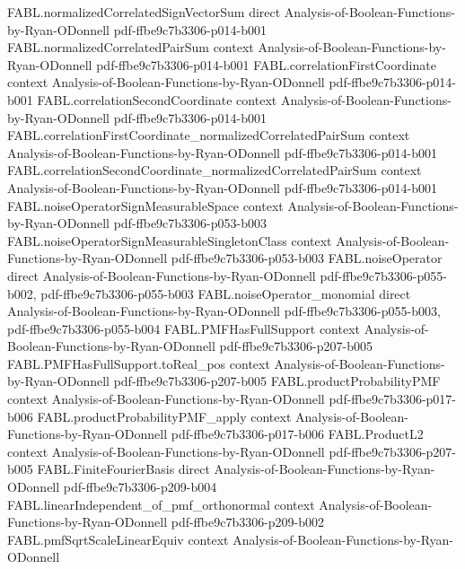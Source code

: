 \begin{theorem}
\proofstep
  {FABL.normalizedCorrelatedSignVectorSum}
  {direct}
  {Analysis-of-Boolean-Functions-by-Ryan-ODonnell}
  {pdf-ffbe9c7b3306-p014-b001}
\proofstep
  {FABL.normalizedCorrelatedPairSum}
  {context}
  {Analysis-of-Boolean-Functions-by-Ryan-ODonnell}
  {pdf-ffbe9c7b3306-p014-b001}
\proofstep
  {FABL.correlationFirstCoordinate}
  {context}
  {Analysis-of-Boolean-Functions-by-Ryan-ODonnell}
  {pdf-ffbe9c7b3306-p014-b001}
\proofstep
  {FABL.correlationSecondCoordinate}
  {context}
  {Analysis-of-Boolean-Functions-by-Ryan-ODonnell}
  {pdf-ffbe9c7b3306-p014-b001}
\proofstep
  {FABL.correlationFirstCoordinate_normalizedCorrelatedPairSum}
  {context}
  {Analysis-of-Boolean-Functions-by-Ryan-ODonnell}
  {pdf-ffbe9c7b3306-p014-b001}
\proofstep
  {FABL.correlationSecondCoordinate_normalizedCorrelatedPairSum}
  {context}
  {Analysis-of-Boolean-Functions-by-Ryan-ODonnell}
  {pdf-ffbe9c7b3306-p014-b001}
\proofstep
  {FABL.noiseOperatorSignMeasurableSpace}
  {context}
  {Analysis-of-Boolean-Functions-by-Ryan-ODonnell}
  {pdf-ffbe9c7b3306-p053-b003}
\proofstep
  {FABL.noiseOperatorSignMeasurableSingletonClass}
  {context}
  {Analysis-of-Boolean-Functions-by-Ryan-ODonnell}
  {pdf-ffbe9c7b3306-p053-b003}
\proofstep
  {FABL.noiseOperator}
  {direct}
  {Analysis-of-Boolean-Functions-by-Ryan-ODonnell}
  {pdf-ffbe9c7b3306-p055-b002,
    pdf-ffbe9c7b3306-p055-b003}
\proofstep
  {FABL.noiseOperator_monomial}
  {direct}
  {Analysis-of-Boolean-Functions-by-Ryan-ODonnell}
  {pdf-ffbe9c7b3306-p055-b003,
    pdf-ffbe9c7b3306-p055-b004}
\proofstep
  {FABL.PMFHasFullSupport}
  {context}
  {Analysis-of-Boolean-Functions-by-Ryan-ODonnell}
  {pdf-ffbe9c7b3306-p207-b005}
\proofstep
  {FABL.PMFHasFullSupport.toReal_pos}
  {context}
  {Analysis-of-Boolean-Functions-by-Ryan-ODonnell}
  {pdf-ffbe9c7b3306-p207-b005}
\proofstep
  {FABL.productProbabilityPMF}
  {context}
  {Analysis-of-Boolean-Functions-by-Ryan-ODonnell}
  {pdf-ffbe9c7b3306-p017-b006}
\proofstep
  {FABL.productProbabilityPMF_apply}
  {context}
  {Analysis-of-Boolean-Functions-by-Ryan-ODonnell}
  {pdf-ffbe9c7b3306-p017-b006}
\proofstep
  {FABL.ProductL2}
  {context}
  {Analysis-of-Boolean-Functions-by-Ryan-ODonnell}
  {pdf-ffbe9c7b3306-p207-b005}
\proofstep
  {FABL.FiniteFourierBasis}
  {direct}
  {Analysis-of-Boolean-Functions-by-Ryan-ODonnell}
  {pdf-ffbe9c7b3306-p209-b004}
\proofstep
  {FABL.linearIndependent_of_pmf_orthonormal}
  {context}
  {Analysis-of-Boolean-Functions-by-Ryan-ODonnell}
  {pdf-ffbe9c7b3306-p209-b002}
\proofstep
  {FABL.pmfSqrtScaleLinearEquiv}
  {context}
  {Analysis-of-Boolean-Functions-by-Ryan-ODonnell}

\end{theorem}
